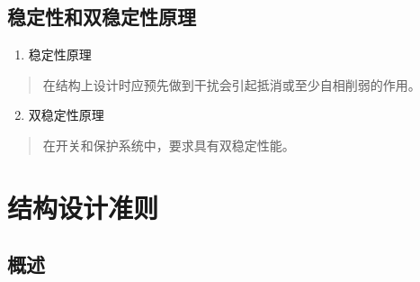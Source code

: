 \documentclass[letterpaper,10pt,english]{sphinxmanual}
\begin{document}
\subsection{稳定性和双稳定性原理}
\label{unit6:id12}\begin{enumerate}
\item {} 
稳定性原理

\end{enumerate}
\begin{quote}

在结构上设计时应预先做到干扰会引起抵消或至少自相削弱的作用。
\end{quote}
\begin{enumerate}
\setcounter{enumi}{1}
\item {} 
双稳定性原理

\end{enumerate}
\begin{quote}

在开关和保护系统中，要求具有双稳定性能。
\end{quote}


\section{结构设计准则}
\label{unit6:id13}

\subsection{概述}
\label{unit6:id14}
\end{document}
